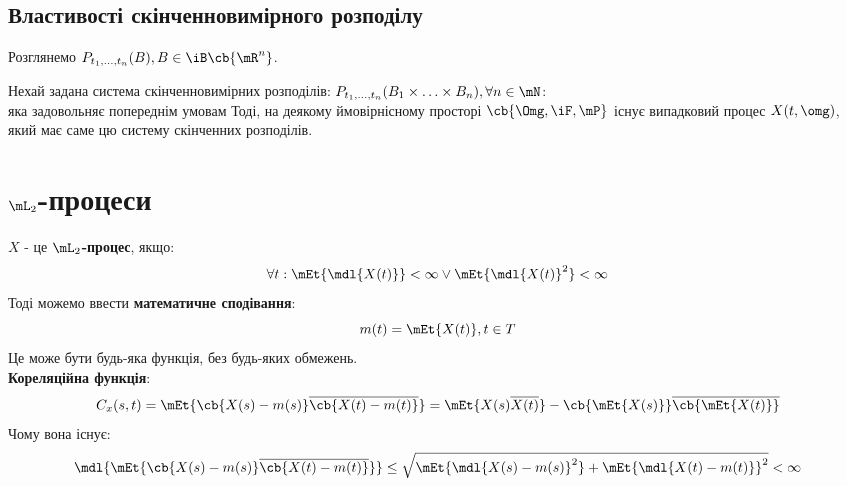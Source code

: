 \subsection{Властивості скінченновимірного розподілу}
Розглянемо $P_{t_1,\ldots,t_n} (B),B\in\iB\cb{\mR^n}$.\\
\begin{teor}
Нехай задана система скінченновимірних розподілів: $P_{t_1,\ldots,t_n}(B_1\times \ldots\times B_n),\forall n\in\mN$:\\
яка задовольняє попереднім умовам %
Тоді, на деякому ймовірнісному просторі $\cb{\Omg,\iF,\mP}$ існує випадковий процес $X(t,\omg)$, який має саме цю систему скінченних розподілів.
\end{teor}
\section{$\mL_2$-процеси}
$X$ - це \textbf{$\mL_2$-процес}, якщо:
\begin{equation}
\forall t:\mEt{\mdl{X(t)}}<\infty \vee \mEt{\mdl{X(t)}^2}<\infty
\end{equation}
Тоді можемо ввести \textbf{математичне сподівання}:
\begin{equation}
m(t) = \mEt{X(t)},t\in T
\end{equation}
Це може бути будь-яка функція, без будь-яких обмежень.\\
\textbf{Кореляційна функція}:
\begin{equation}
C_x(s,t) = \mEt{\cb{X(s)-m(s)}\overline{\cb{X(t)-m(t)}}} = \mEt{X(s)\overline{X(t)}} - \cb{\mEt{X(s)}}\overline{\cb{\mEt{X(t)}}}
\end{equation}
Чому вона існує:
\begin{equation}
\mdl{\mEt{\cb{X(s)-m(s)}\overline{\cb{X(t)-m(t)}}}} \leq \sqrt{\mEt{\mdl{X(s)-m(s)}^2} + \mEt{\mdl{X(t)-m(t)}}^2} < \infty
\end{equation}
